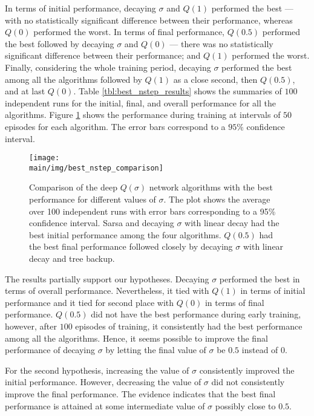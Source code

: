 In terms of initial performance, decaying $\sigma$ and $Q(1)$ performed the best --- with no statistically significant difference between their performance, whereas $Q(0)$ performed the worst.
In terms of final performance, $Q(0.5)$ performed the best followed by decaying $\sigma$ and $Q(0)$ --- there was no statistically significant difference between their performance; and $Q(1)$ performed the worst.
Finally, considering the whole training period, decaying $\sigma$ performed the best among all the algorithms followed by $Q(1)$ as a close second, then $Q(0.5)$, and at last $Q(0)$.
Table \ref{tbl:best_nstep_results} shows the summaries of $100$ independent runs for the initial, final, and overall performance for all the algorithms.
Figure \ref{fig:best_nstep} shows the performance during training at intervals of $50$ episodes for each algorithm.
The error bars correspond to a $95\%$ confidence interval.


\begin{figure}[t]
    \setlength{\abovecaptionskip}{0pt plus 0pt minus 0pt}
    \centering
    \texttt{[image: \\main/img/best\_nstep\_comparison]}
    \caption[Comparison of the Deep $Q(\sigma)$ Network Algorithms with the Best Performance for Different Values of $\sigma$] {Comparison of the deep $Q(\sigma)$ network algorithms with the best performance for different values of $\sigma$.
    The plot shows the average over 100 independent runs with error bars corresponding to a 95\% confidence interval.
    Sarsa and decaying $\sigma$ with linear decay had the best initial performance among the four algorithms. 
    $Q(0.5)$ had the best final performance followed closely by decaying $\sigma$ with linear decay and tree backup.
    }
    \label{fig:best_nstep}
\end{figure}

The results partially support our hypotheses.
Decaying $\sigma$ performed the best in terms of overall performance.
Nevertheless, it tied with $Q(1)$ in terms of initial performance and it tied for second place with $Q(0)$ in terms of final performance.
$Q(0.5)$ did not have the best performance during early training, however, after $100$ episodes of training, it consistently had the best performance among all the algorithms.
Hence, it seems possible to improve the final performance of decaying $\sigma$ by letting the final value of $\sigma$ be $0.5$ instead of $0$.

For the second hypothesis, increasing the value of $\sigma$ consistently improved the initial performance.
However, decreasing the value of $\sigma$ did not consistently improve the final performance.
The evidence indicates that the best final performance is attained at some intermediate value of $\sigma$ possibly close to $0.5$. 

